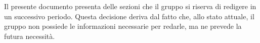 Il presente documento presenta delle sezioni che il gruppo \gruppo \space si riserva di redigere in un successivo periodo. Questa decisione deriva dal fatto che, allo stato attuale, il gruppo \gruppo \space non possiede le informazioni necessarie per redarle, ma ne prevede la futura necessità.